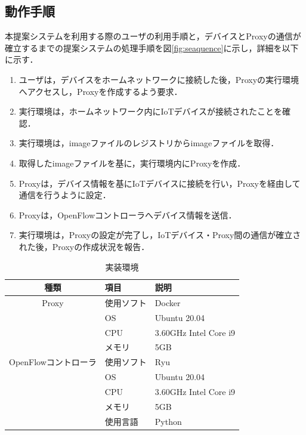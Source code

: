 \documentclass[a4paper,10pt,twocolumn,uplatex]{jsarticle}
\begin{document}
\subsection{動作手順}
本提案システムを利用する際のユーザの利用手順と，デバイスとProxyの通信が確立するまでの提案システムの処理手順を図\ref{fig:seaquence}に示し，詳細を以下に示す．
\begin{enumerate}
  \item ユーザは，デバイスをホームネットワークに接続した後，Proxyの実行環境へアクセスし，Proxyを作成するよう要求．
  \item 実行環境は，ホームネットワーク内にIoTデバイスが接続されたことを確認．
  \item 実行環境は，imageファイルのレジストリからimageファイルを取得．
  \item 取得したimageファイルを基に，実行環境内にProxyを作成．
  \item Proxyは，デバイス情報を基にIoTデバイスに接続を行い，Proxyを経由して通信を行うように設定．
  \item Proxyは，OpenFlowコントローラへデバイス情報を送信．
  \item 実行環境は，Proxyの設定が完了し，IoTデバイス・Proxy間の通信が確立された後，Proxyの作成状況を報告．
\end{enumerate}

\begin{table}[!tb]
  \caption{実装環境}
  \label{tab:program}
  \centering
  \begin{tabular}{c|l|l}
    \hline
    種類                 & 項目       & 説明                  \\
    \hline \hline
    Proxy                & 使用ソフト & Docker                \\
                         & OS         & Ubuntu 20.04          \\
                         & CPU        & 3.60GHz Intel Core i9 \\
                         & メモリ     & 5GB                   \\
    \hline
    OpenFlowコントローラ & 使用ソフト & Ryu                   \\
                         & OS         & Ubuntu 20.04          \\
                         & CPU        & 3.60GHz Intel Core i9 \\
                         & メモリ     & 5GB                   \\
                         & 使用言語   & Python                \\
    \hline
  \end{tabular}
\end{table}
\end{document}
